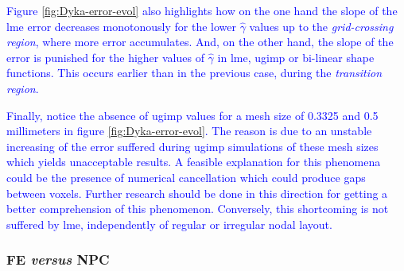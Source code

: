 \documentclass[preprint,12pt,a4paper]{elsarticle}
\begin{document}
\textcolor{blue}{Figure \eqref{fig:Dyka-error-evol} also highlights how on the one hand the slope of the \acrshort{lme} error decreases monotonously for the lower $\widehat{\gamma}$ values up to the \textit{grid-crossing region}, where more error accumulates. And, on the other hand, the slope of the error is punished for the higher values of $\widehat{\gamma}$ in \acrshort{lme}, \acrshort{ugimp} or bi-linear shape functions. This occurs earlier than in the previous case, during the \textit{transition region}.}

\textcolor{blue}{Finally, notice the absence of \acrshort{ugimp} values for a mesh size of 0.3325 and 0.5 millimeters in figure \eqref{fig:Dyka-error-evol}. The reason is due to an unstable increasing of the error suffered during \acrshort{ugimp} simulations of these mesh sizes which yields unacceptable results. A feasible explanation for this phenomena could be the presence of numerical cancellation which could produce gaps between voxels. Further research should be done in this direction for getting a better comprehension of this phenomenon. Conversely, this shortcoming is not suffered by \acrshort{lme}, independently of regular or irregular nodal layout.}

\subsubsection{FE \textit{versus} NPC}
\label{sec:FE-vs-NPC}
\end{document}
